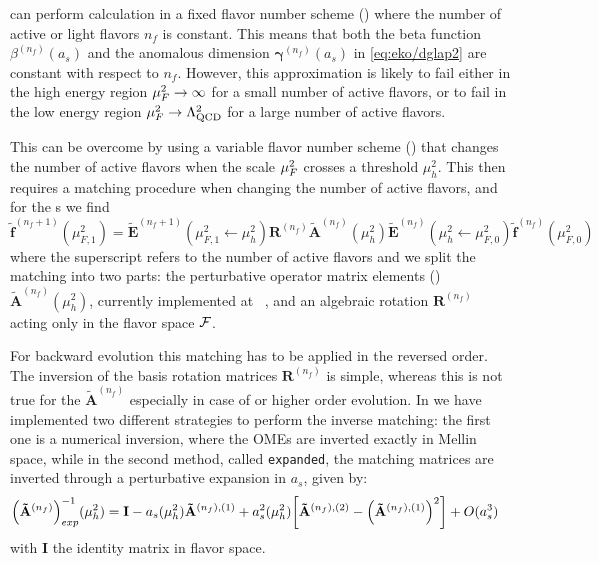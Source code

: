\eko{} can perform calculation in a fixed flavor number scheme (\ffns{}) where
the number of active or light flavors $n_f$ is constant. This means that both
the beta function $\beta^{(n_f)}(a_s)$ and the anomalous dimension
$\bm{\gamma}^{(n_f)}(a_s)$ in \cref{eq:eko/dglap2} are constant with respect to
$n_f$.
However, this approximation is likely to fail either in the high energy region
$\mu_F^2 \to \infty$ for a small number of active flavors, or to fail in the low
energy region $\mu_F^2 \to \Lambda_{\text{QCD}}^2$ for a large number of active
flavors.

This can be overcome by using a variable flavor number scheme (\vfns{}) that
changes the number of active flavors when the scale $\mu_F^2$ crosses a
threshold $\mu_h^2$.
This then requires a matching procedure when changing the number of active
flavors, and for the \pdf{}s we find
\begin{equation}
    \tilde{\mathbf{f}}^{(n_f+1)}(\mu_{F,1}^2)= \tilde{\mathbf{E}}^{(n_f+1)}(\mu_{F,1}^2\leftarrow \mu_{h}^2) {\mathbf{R}^{(n_f)}} \tilde{\mathbf{A}}^{(n_f)}(\mu_{h}^2) \tilde{\mathbf{E}}^{(n_f)}(\mu_{h}^2\leftarrow \mu_{F,0}^2) \tilde{\mathbf{f}}^{(n_f)}(\mu_{F,0}^2)
    \label{eq:eko/matching}
\end{equation}
where the superscript refers to the number of active flavors and we split the matching into two
parts: the perturbative operator matrix elements (\ome{}) $\tilde{\mathbf{A}}^{(n_f)}(\mu_{h}^2)$,
currently implemented at \nnlo{}~\cite{Buza_1998}, and an algebraic rotation ${\mathbf{R}^{(n_f)}}$ acting
only in the flavor space $\mathcal{F}$.

For backward evolution this matching has to be applied in the reversed order.
The inversion of the basis rotation matrices $\mathbf{R}^{(n_f)}$ is simple,
whereas this is not true for the \ome{} $\mathbf{\tilde A}^{(n_f)}$ especially
in case of \nnlo{} or higher order evolution.
In \eko{} we have implemented two different strategies to perform the inverse
matching: the first one is a numerical inversion, where the OMEs are inverted
exactly in Mellin space, while in the second method, called \texttt{expanded},
the matching matrices are inverted through a perturbative expansion in $a_s$,
given by:
\begin{align}
    \qty(\mathbf{\tilde A}^{(n_f)})_{exp}^{-1}(\mu_{h}^2) &= \mathbf{I} - a_s(\mu_{h}^2) \mathbf{\tilde A}^{(n_f),(1)} + a_s^2(\mu_{h}^2) \qty[ \mathbf{\tilde A}^{(n_f),(2)} - \qty(\mathbf{\tilde A}^{(n_f),(1)})^2 ] + O(a_s^3)
    \label{eq:eko/invmatchingexp}
\end{align}
with $\mathbf{I}$ the identity matrix in flavor space.
